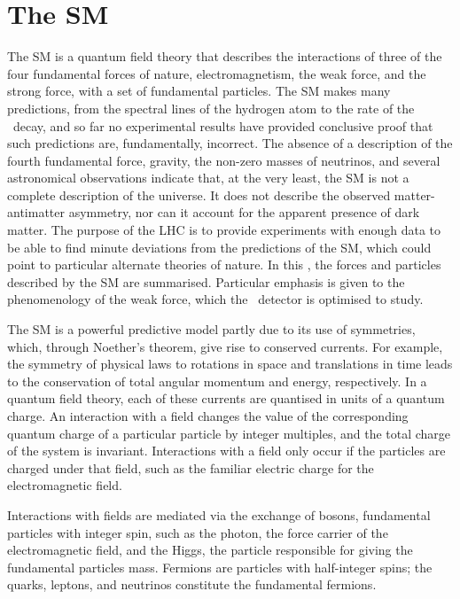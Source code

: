 \chapter{The \acl{SM}}
\label{chap:intro:sm}


The \acf{SM} is a quantum field theory that describes the interactions of three 
of the four fundamental forces of nature, electromagnetism, the weak force, and 
the strong force, with a set of fundamental particles.
The \ac{SM} makes many predictions, from the spectral lines of the hydrogen  
atom to the rate of the \BsTomumu\ decay, and so far no experimental results 
have provided conclusive proof that such predictions are, fundamentally, 
incorrect.
The absence of a description of the fourth fundamental force, gravity, the 
non-zero masses of neutrinos, and several astronomical observations indicate 
that, at the very least, the \ac{SM} is not a complete description of the 
universe.
It does not describe the observed matter-antimatter asymmetry, nor can it 
account for the apparent presence of dark matter.
The purpose of the \ac{LHC} is to provide experiments with enough data to be 
able to find minute deviations from the predictions of the \ac{SM}, which could 
point to particular alternate theories of nature.
In this , the forces and particles described by the 
\ac{SM} are summarised.
Particular emphasis is given to the phenomenology of the weak force, which the 
\lhcb\ detector is optimised to study.

The \ac{SM} is a powerful predictive model partly due to its use of symmetries, 
which, through Noether's theorem, give rise to conserved currents.
For example, the symmetry of physical laws to rotations in space and 
translations in time leads to the conservation of total angular momentum and 
energy, respectively.
In a quantum field theory, each of these currents are quantised in units of a 
quantum charge.
An interaction with a field changes the value of the corresponding quantum 
charge of a particular particle by integer multiples, and the total charge of 
the system is invariant.
Interactions with a field only occur if the particles are charged under that 
field, such as the familiar electric charge for the electromagnetic field.

Interactions with fields are mediated via the exchange of bosons, fundamental 
particles with integer spin, such as the photon, the force carrier of the 
electromagnetic field, and the Higgs, the particle responsible for giving the 
fundamental particles mass.
Fermions are particles with half-integer spins; the quarks, leptons, and 
neutrinos constitute the fundamental fermions.

